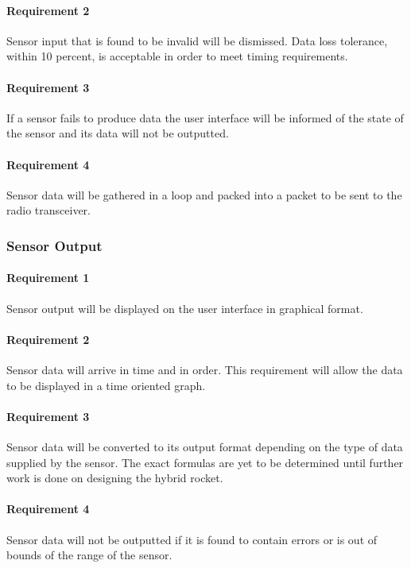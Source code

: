 \documentclass[10pt,draftclsnofoot,onecolumn,retainorgcmds]{IEEEtran}
\begin{document}
\paragraph{ Requirement 2} Sensor input that is found to be invalid will be dismissed. Data loss tolerance, within 10 percent, is acceptable in order to meet timing requirements.\par
\paragraph{ Requirement 3}If a sensor fails to produce data the user interface will be informed of the state of the sensor and its data will not be outputted.\par
\paragraph{ Requirement 4}Sensor data will be gathered in a loop and packed into a packet to be sent to the radio transceiver.\par
\subsubsection{Sensor Output}
\paragraph{ Requirement 1}Sensor output will be displayed on the user interface in graphical format.\par
\paragraph{ Requirement 2}Sensor data will arrive in time and in order. This requirement will allow the data to be displayed in a time oriented graph.\par
\paragraph{ Requirement 3}Sensor data will be converted to its output format depending on the type of data supplied by the sensor. The exact formulas are yet to be determined until further work is done on designing the hybrid rocket.\par
\paragraph{ Requirement 4}Sensor data will not be outputted if it is found to contain errors or is out of bounds of the range of the sensor.\par
\end{document}
